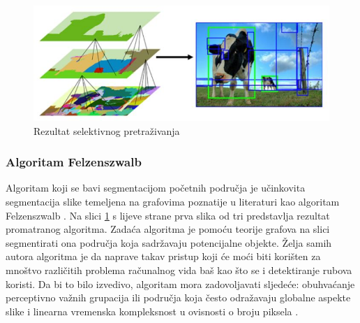 \documentclass[times, utf8, diplomski]{fer}
\begin{document}
\begin{figure}[H]
    \centering
    \includegraphics[scale=0.75]{figures/detector/ss.jpg}
    \caption[Caption for LOF]{Rezultat selektivnog pretraživanja\footnotemark}
    \label{fig:ss}
\end{figure}

\subsubsection{Algoritam Felzenszwalb}
Algoritam koji se bavi segmentacijom početnih područja je učinkovita segmentacija slike temeljena na grafovima  poznatije u literaturi kao algoritam Felzenszwalb . Na slici \ref{fig:ss} s lijeve strane prva slika od tri predstavlja rezultat promatranog algoritma. Zadaća algoritma je pomoću teorije grafova na slici segmentirati ona područja koja sadržavaju potencijalne objekte. Želja samih autora algoritma je da naprave takav pristup koji će moći biti korišten za mnoštvo različitih problema računalnog vida baš kao što se i detektiranje rubova  koristi. Da bi to bilo izvedivo, algoritam mora zadovoljavati sljedeće: obuhvaćanje perceptivno važnih grupacija ili područja koja često odražavaju globalne aspekte slike i linearna vremenska kompleksnost u ovisnosti o broju piksela \citep{Felzenszwalb2004}.
\end{document}

